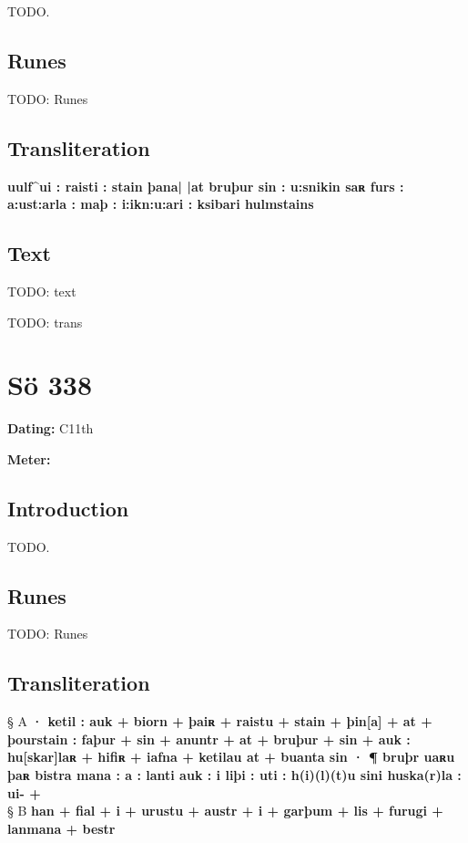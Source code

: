 TODO.

\subsection{Runes}

TODO: Runes%

\subsection{Transliteration}

\textbf{uulf\textasciicircum ui : raisti : stain þana| |at bruþur sin : u:snikin saʀ furs : a:ust:arla : maþ : i:ikn:u:ari : ksibari hulmstains}

\subsection{Text}

\bpg\bpa[0]%
TODO: text\epa

\bpb TODO: trans\epb\epg

\sectionline\clearpage


\section{Sö 338}

\begin{flushright}%
\textbf{Dating:} C11th

\textbf{Meter:} \Fornyrdislag
\end{flushright}%

\subsection{Introduction}

TODO.

\subsection{Runes}

TODO: Runes%

\subsection{Transliteration}

§ A \textbf{· ketil : auk + biorn + þaiʀ + raistu + stain + þin[a] + at + þourstain : faþur + sin + anuntr + at + bruþur + sin + auk : hu[skar]laʀ + hifiʀ + iafna + ketilau at + buanta sin · ¶ bruþr uaʀu þaʀ bistra mana : a : lanti auk : i liþi : uti : h(i)(l)(t)u sini huska(r)la : ui- +} \\
§ B \textbf{han + fial + i + urustu + austr + i + garþum + lis + furugi + lanmana + bestr}

